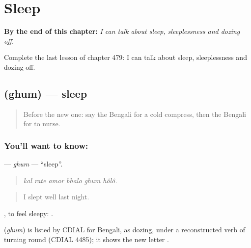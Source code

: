 
\chapter{Sleep}
\label{ch:bn-sleep}

\begin{chapteropening}
\textbf{By the end of this chapter:} \emph{I can talk about sleep, sleeplessness and dozing off.}

Complete the last lesson of chapter 479: I can talk about sleep, sleeplessness and dozing off.
\end{chapteropening}

\section[\texorpdfstring{\bn{ঘুম} (ghum)}{ঘুম (ghum)}]{ (ghum) — sleep}

\label{lesson:BN-C479-ghum}



\begin{quote}
Before the new one: say the Bengali for a cold compress, then the Bengali for to nurse.
\end{quote}

\subsection*{You'll want to know: }
\textbf{} — \emph{ghum} — \textquotedblleft{}sleep\textquotedblright{}.

\begin{quote}
     
\end{quote}

\begin{quote}
\emph{kāl rāte āmār bhālo ghum hôlô.}
\end{quote}

\begin{quote}
I slept well last night.
\end{quote}

 , to feel sleepy:   .

\begin{cousinweb}
\textbf{} (\emph{ghum}) is listed by CDIAL for Bengali, as dozing, under a reconstructed verb of turning round (CDIAL 4485); it shows the new letter .
\end{cousinweb}

